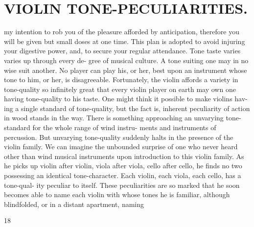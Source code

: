 \documentclass{article}
\begin{document}
\section*{VIOLIN TONE-PECULIARITIES.}
my intention to rob you of the pleasure afforded by anticipation, therefore you will be given but small doses at one time. This plan is adopted to avoid injuring your digestive power, and, to secure your regular attendance. Tone taste varies varies up through every de- gree of musical culture. A tone suiting one may in no wise suit another. No player can play his, or her, best upon an instrument whose tone to him, or her, is disagreeable. Fortunately, the violin affords a variety in tone-quality so infinitely great that every violin player on earth may own one having tone-quality to his taste. One might think it possible to make violins hav- ing a single standard of tone-quality, but the fact is, inherent peculiarity of action in wood stands in the way. There is something approaching an unvarying tone-standard for the whole range of wind instru- ments and instruments of percussion. But unvarying tone-quality suddenly halts in the presence of the violin family. We can imagine the unbounded surprise of one who never heard other than wind musical instruments upon introduction to this violin family. As he picks up violin after violin, viola after viola, cello after cello, he finds no two possessing an identical tone-character. Each violin, each viola, each cello, has a tone-qual- ity peculiar to itself. These peculiarities are so marked that he soon becomes able to name each violin with whose tones he is familiar, although blindfolded, or in a distant apartment, naming

18
\end{document}
